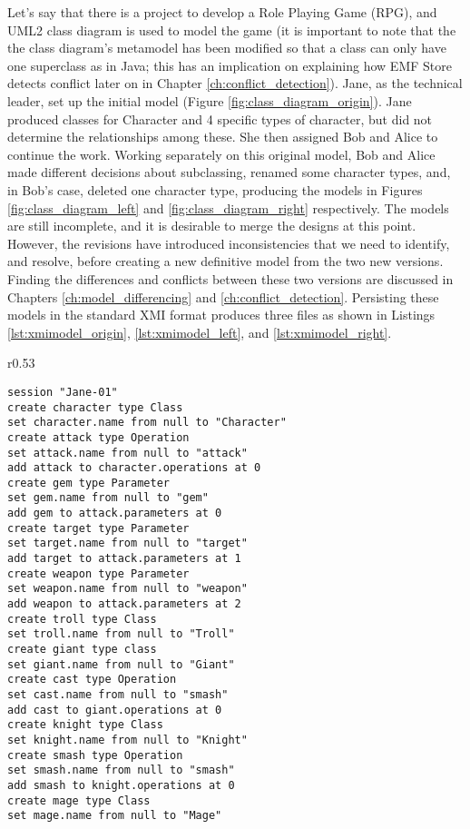 Let's say that there is a project to develop a Role Playing Game (RPG), and UML2 class diagram is used to model the game (it is important to note that the the class diagram's metamodel has been modified so that a class can only have one superclass as in Java; this has an implication on explaining how EMF Store detects conflict later on in Chapter \ref{ch:conflict_detection}). Jane, as the technical leader, set up the initial model (Figure \ref{fig:class_diagram_origin}). Jane produced classes for Character and 4 specific types of character, but did not determine the relationships among these. She then assigned Bob and Alice to continue the work. Working separately on this original model, Bob and Alice made different decisions about subclassing, renamed some character types, and, in Bob’s case, deleted one character type, producing the models in Figures \ref{fig:class_diagram_left} and \ref{fig:class_diagram_right} respectively. The models are still incomplete, and it is desirable to merge the designs at this point. However, the revisions have introduced inconsistencies that we need to identify, and resolve, before creating a new definitive model from the two new versions. Finding the differences and conflicts between these two versions are discussed in Chapters \ref{ch:model_differencing} and \ref{ch:conflict_detection}. Persisting these models in the standard XMI \cite{omg2018xmi} format produces three files as shown in Listings \ref{lst:xmimodel_origin}, \ref{lst:xmimodel_left}, and \ref{lst:xmimodel_right}. 

\begin{wrapfigure}[23]{r}{0.53\textwidth}
\vspace{-32pt}
\begin{lstlisting}[style=eol,caption={Change-based representation of the original version in Figure \ref{fig:class_diagram_origin}.},label=lst:cbp_origin]
session "Jane-01"
create character type Class
set character.name from null to "Character" 
create attack type Operation
set attack.name from null to "attack" 
add attack to character.operations at 0
create gem type Parameter
set gem.name from null to "gem" 
add gem to attack.parameters at 0
create target type Parameter
set target.name from null to "target" 
add target to attack.parameters at 1
create weapon type Parameter
set weapon.name from null to "weapon" 
add weapon to attack.parameters at 2
create troll type Class
set troll.name from null to "Troll" 
create giant type class
set giant.name from null to "Giant"
create cast type Operation
set cast.name from null to "smash"
add cast to giant.operations at 0
create knight type Class
set knight.name from null to "Knight"
create smash type Operation
set smash.name from null to "smash"
add smash to knight.operations at 0
create mage type Class
set mage.name from null to "Mage" 
\end{lstlisting}
\end{wrapfigure}

